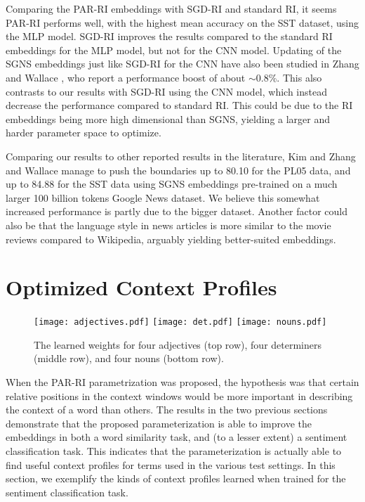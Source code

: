 \documentclass[11pt]{article}
\begin{document}
Comparing the PAR-RI embeddings with SGD-RI and standard RI, it seems PAR-RI performs well, with the highest mean accuracy on the SST dataset, using the MLP model. SGD-RI improves the results compared to the standard RI embeddings for the MLP model, but not for the CNN model. Updating of the SGNS embeddings just like SGD-RI for the CNN have also been studied in Zhang and Wallace , who report a performance boost of about $\sim$0.8\%. This also contrasts to our results with SGD-RI using the CNN model, which instead decrease the performance compared to standard RI. This could be due to the RI embeddings being more high dimensional than SGNS, yielding a larger and harder parameter space to optimize.

Comparing our results to other reported results in the literature, Kim  and Zhang and Wallace  manage to push the boundaries up to 80.10 for the PL05 data, and up to 84.88 for the SST data using SGNS embeddings pre-trained on a much larger 100 billion tokens Google News dataset. We believe this somewhat increased performance is partly due to the bigger dataset. Another factor could also be that the language style in news articles is more similar to the movie reviews compared to Wikipedia, arguably yielding better-suited embeddings.
 
\section{Optimized Context Profiles}

\begin{figure*}[t]
  \centering
  \texttt{[image: adjectives.pdf]}
    \texttt{[image: det.pdf]}
      \texttt{[image: nouns.pdf]}
  \caption{\label{fig:att_ri_adj} The learned weights for four adjectives (top row), four determiners (middle row), and four nouns (bottom row).}
\end{figure*}

When the PAR-RI parametrization was proposed, the hypothesis was that certain relative positions in the context windows would be more important in describing the context of a word than others. The results in the two previous sections demonstrate that the proposed parameterization is able to improve the embeddings in both a word similarity task, and (to a lesser extent) a sentiment classification task. This indicates that the parameterization is actually able to find useful context profiles for terms used in the various test settings. In this section, we exemplify the kinds of context profiles learned when trained for the sentiment classification task. 
\end{document}
